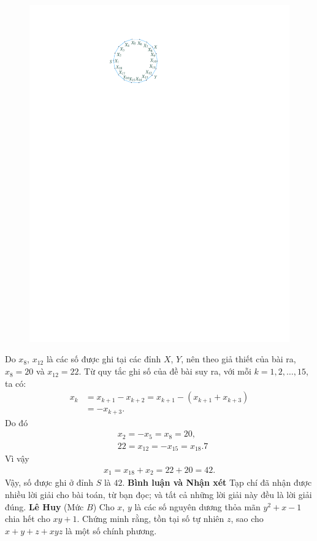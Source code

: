 \begin{multicols}{2}
\begin{figure}[H]
		\includegraphics[width=0.7\linewidth]{P641}
		\vspace*{-10pt}
	\end{figure}
	Do $x_8$, $x_{12}$ là các số được ghi tại các đỉnh $X$, $Y$, nên theo giả thiết của bài ra, $x_8 =20$  và  $x_{12} = 22$.
	\vskip 0.05cm
	Từ quy tắc ghi số của đề bài suy ra, với mỗi $k = 1, 2, \ldots, 15$, ta có:
	\begin{align*}
		{x_k} &= {x_{k + 1}} - {x_{k + 2}} = {x_{k + 1}} - \left( {{x_{k + 1}} + {x_{k + 3}}} \right) \\
		&=  - {x_{k + 3}}.
	\end{align*}
	Do đó
		\begin{align*}
			&{x_2} =  - {x_5} = {x_8} = 20,\\
			&22 = {x_{12}} =  - {x_{15}} = {x_{18}}.7
		\end{align*}
	Vì vậy
	\begin{align*}
		{x_1} = {x_{18}} + {x_2} = 22 + 20 = 42.
	\end{align*}
	Vậy, số được ghi ở đỉnh $S$ là $42$.
	\vskip 0.05cm
	\textbf{\color{thachthuctoanhoc}Bình luận và Nhận xét}
	\vskip 0.05cm	
	Tạp chí đã nhận được nhiều lời giải cho bài toán, từ bạn đọc; và tất cả những lời giải này đều là lời giải đúng.
	\vskip 0.1cm
	\hfill	\textbf{\color{thachthuctoanhoc}Lê Huy}
	\vskip 0.1cm
	{}
	(Mức $B$)
	Cho $x$, $y$ là các số nguyên dương thỏa mãn $y^2 \!+\! x \!-\! 1$ chia hết cho $xy \!+\! 1$. Chứng minh rằng, tồn tại số tự nhiên $z$, sao cho $x + y + z + xyz$ là một số chính phương.

\end{multicols}
